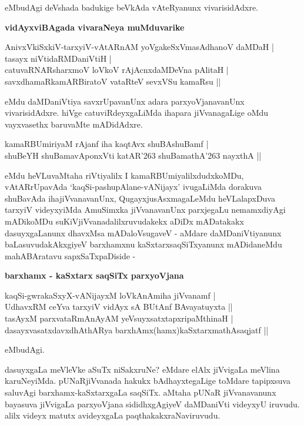 \noindent
eMbudAgi deVshada badukige beVkAda vAteRyanunx vivarisidAdxre.

{\bigskip
\noindent
{\large\bf vidAyxviBAgada vivaraNeya muMduvarike}}\label{90c}
\medskip

\begin{shloka}
AnivxVkiSxkiV-tarxyiV-vAtARnAM yoVgakeSxVmasAdhanoV daMDaH |\\\label{90d}
tasayx niVtidaRMDaniVtiH |\\
catuvaRNARsharxmoV loVkoV rAjAcnxdaMDeVna pAlitaH |\\\label{90e}
savxdhamaRkamARBiratoV vataRteV sevxVSu kamaRsu ||
\end{shloka}

\noindent
eMdu daMDaniVtiya savxrUpavanUnx adara parxyoVjanavanUnx vivarisidAdxre. hiVge catuviRdeyxgaLiMda ihapara jiVvanagaLige oMdu vayxvasethx baruvaMte mADidAdxre.

\begin{shloka}
kamaRBUmiriyaM rAjanf iha kaqtAvx shuBAshuBamf |\\\label{90f}
shuBeYH shuBamavAponxVti katAR\char'263 shuBamathA\char'263 nayxthA ||
\end{shloka}

\noindent
eMdu heVLuvaMtaha riVtiyalilx I kamaRBUmiyalilxdudxkoMDu, vAtARrUpavAda `kaqSi-pashupAlane-vANijayx' ivugaLiMda dorakuva shuBavAda ihajiVvanavanUnx, QugayxjusAsxmagaLeMdu heVLalapxDuva tarxyiV videyxyiMda AmuSimxka jiVvanavanUnx parxjegaLu nemamxdiyAgi mADikoMDu suKiVjiVvanadalilxruvudakekx aDiDx mADatakakx dasuyxgaLanunx dhavxMsa mADaloVsugaveV - aMdare daMDaniVtiyanunx baLasuvudakAkxgiyeV barxhamxnu kaSxtarxsaqSiTxyanunx mADidaneMdu mahABAratavu sapxSaTxpaDiside - 

{\bigskip
\noindent
{\large\bf barxhamx - kaSxtarx saqSiTx parxyoVjana}}\label{page91}
\medskip

\begin{shloka}
kaqSi-gwrakaSxyX-vANijayxM loVkAnAmiha jiVvanamf |\\\label{91}
UdhavxRM ceYva tarxyiV vidAyx sA BUtAnf BAvayatuyxta ||\\
tasAyxM parxvataRmAnAyAM yeVsuyxsatxtapxripaMthinaH |\\
dasayxvasatxdavxdhAthARya barxhAmx(hamx)kaSxtarxmathAsaqjatf ||
\end{shloka}

\noindent
eMbudAgi.

dasuyxgaLa meVleVke aSuTx niSakxruNe? eMdare elAlx jiVvigaLa meVlina karuNeyiMda. pUNaRjiVvanada hakukx bAdhayxtegaLige toMdare tapipxsuva saluvAgi barxhamx-kaSxtarxgaLa saqSiTx. aMtaha pUNaR jiVvanavanunx bayasuva jiVvigaLa parxyoVjana sididhxgAgiyeV daMDaniVti videyxyU iruvudu. alilx videyx matutx avideyxgaLa paqthakakxraNaviruvudu.

